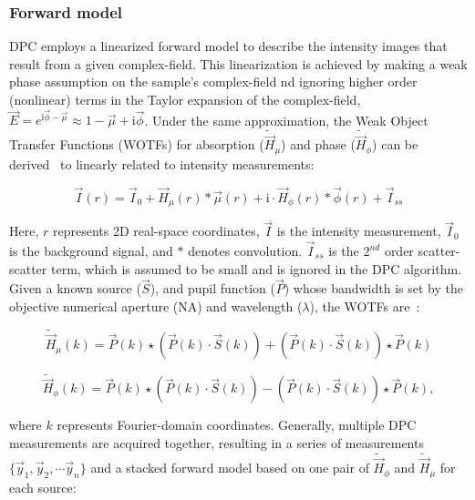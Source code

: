 \subsubsection{Forward model}
\label{sec:forward}
DPC employs a linearized forward model to describe the intensity images that result from a given complex-field. This linearization is achieved by making a weak phase assumption on the sample's complex-field nd ignoring higher order (nonlinear) terms in the Taylor expansion of the complex-field, $\vec{E} = e^{\mathrm{i}\vec{\phi} -\vec{\mu}} \approx 1 - \vec{\mu} + \mathrm{i}\vec{\phi}$.
Under the same approximation, the Weak Object Transfer Functions (WOTFs) for absorption ($\tilde{\vec{H}}_{\mu}$) and phase ($\tilde{\vec{H}}_{\phi}$) can be derived~\cite{Claus2015, tian2015quantitative, Hamilton1984a} to linearly related to intensity measurements:

\begin{equation}
	\vec{I}(r) = \vec{I}_{0} +\vec{H}_{\mu}(r) * \vec{\mu}(r) + \mathrm{i}\cdot \vec{H}_{\phi}(r) * \vec{\phi}(r) + \vec{I}_{ss}
	\label{eq:wotf_2}
\end{equation}

\noindent Here, $r$ represents 2D real-space coordinates, $\vec{I}$ is the intensity measurement, $\vec{I}_0$ is the background signal, and $*$ denotes convolution. $\vec{I}_{ss}$ is the $2^{nd}$ order scatter-scatter term, which is assumed to be small and is ignored in the DPC algorithm. Given a known source ($\vec{S}$), and pupil function ($\vec{P}$) whose bandwidth is set by the objective numerical aperture (NA) and wavelength ($\lambda$), the WOTFs are~\cite{Claus2015,tian2015quantitative}:

\begin{equation}\label{WOTF_re}
\tilde{\vec{H}}_{\mu}(k) = \vec{P}(k) \star (\vec{P}(k)\cdot \vec{S}(k))+ (\vec{P}(k) \cdot \vec{S}(k)) \star \vec{P}(k)
\end{equation}

\begin{equation}\label{WOTF_im}
\tilde{\vec{H}}_{\phi} (k) = \vec{P}(k) \star (\vec{P}(k)\cdot \vec{S}(k))- (\vec{P}(k) \cdot \vec{S}(k)) \star \vec{P}(k),
\end{equation}

\noindent where $k$ represents Fourier-domain coordinates. Generally, multiple DPC measurements are acquired together, resulting in a series of measurements $\{\vec{y}_1, \vec{y}_2, \cdots \vec{y}_n\}$ and a stacked forward model based on one pair of $\tilde{\vec{H}}_{\phi}$ and $\tilde{\vec{H}}_{\mu}$ for each source:

